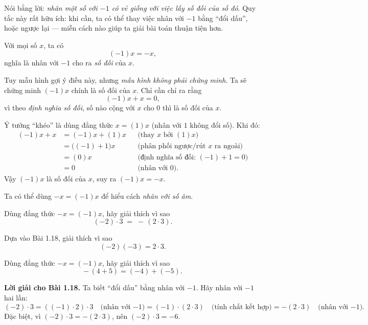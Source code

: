 \medskip
Nói bằng lời: \emph{nhân một số với \(-1\) có vẻ giống với việc lấy số đối
của số đó}. Quy tắc này rất hữu ích: khi cần, ta có thể thay việc nhân với
\(-1\) bằng “đổi dấu”, hoặc ngược lại — miễn cách nào giúp ta giải bài toán
thuận tiện hơn.


\begin{tcolorbox}[colback=yellow!10, colframe=orange!80!black,
title={Quan trọng: Nhân với \(-1\)}]
Với mọi số \(x\), ta có
\[
(-1)x=-x,
\]
nghĩa là nhân với \(-1\) cho ra \emph{số đối} của \(x\).
\end{tcolorbox}

Tuy mẫu hình gợi ý điều này, nhưng \emph{mẫu hình không phải chứng minh}.
Ta sẽ chứng minh \((-1)x\) chính là số đối của \(x\). Chỉ cần chỉ ra rằng
\[
(-1)x + x = 0,
\]
vì theo \emph{định nghĩa số đối}, số nào cộng với \(x\) cho \(0\) thì là
số đối của \(x\).

Ý tưởng “khéo” là dùng đẳng thức \(x=(1)x\) (nhân với \(1\) không đổi số).
Khi đó:
\[
\begin{aligned}
(-1)x + x &= (-1)x + (1)x && \text{(thay \(x\) bởi \((1)x\))}\\
          &= \bigl((-1)+1\bigr)x && \text{(phân phối ngược/rút \(x\) ra ngoài)}\\
          &= (0)x && \text{(định nghĩa số đối: \((-1)+1=0\))}\\
          &= 0 && \text{(nhân với \(0\))}.
\end{aligned}
\]
Vậy \((-1)x\) là số đối của \(x\), suy ra \(\boxed{(-1)x=-x}\).

Ta có thể dùng \(-x=(-1)x\) để hiểu cách \emph{nhân với số âm}.

\begin{problem}[1.18]
Dùng đẳng thức \(-x=(-1)x\), hãy giải thích vì sao
\[
(-2)\cdot3 \;=\; -\,(2\cdot3).
\]
\end{problem}

\begin{problem}[1.19]
Dựa vào Bài 1.18, giải thích vì sao
\[
(-2)(-3)=2\cdot3.
\]
\end{problem}

\begin{problem}[1.20]
Dùng đẳng thức \(-x=(-1)x\), hãy giải thích vì sao
\[
-\,(4+5)=(-4)+(-5).
\]
\end{problem}

\noindent\textbf{Lời giải cho Bài 1.18.}
Ta biết “đổi dấu” bằng nhân với \(-1\).
Hãy nhân với $-1$ hai lần:
\[
(-2)\cdot 3
= ((-1)\cdot 2)\cdot 3 \quad\text{(nhân với $-1$)}
= (-1)\cdot (2\cdot 3) \quad\text{(tính chất kết hợp)}
= -(2\cdot 3) \quad\text{(nhân với $-1$).}
\]
Đặc biệt, vì $(-2)\cdot 3 = -(2\cdot 3)$, nên $(-2)\cdot 3 = -6$.

